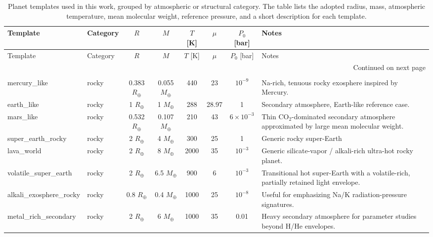 \begin{longtable}{llcccccl}
\caption{Planet templates used in this work, grouped by atmospheric or structural category. The table lists the adopted radius, mass, atmospheric temperature, mean molecular weight, reference pressure, and a short description for each template.} \\
\toprule
Template & Category & $R$ & $M$ & $T$ [K] & $\mu$ & $P_0$ [bar] & Notes \\
\midrule
\endfirsthead

\toprule
Template & Category & $R$ & $M$ & $T$ [K] & $\mu$ & $P_0$ [bar] & Notes \\
\midrule
\endhead

\midrule
\multicolumn{8}{r}{Continued on next page} \\
\midrule
\endfoot

\bottomrule
\endlastfoot

\multicolumn{8}{l}{\textbf{Rocky / terrestrial templates}} \\
\midrule
mercury\_like & rocky & 0.383 $R_\oplus$ & 0.055 $M_\oplus$ & 440 & 23 & $10^{-9}$ & Na-rich, tenuous rocky exosphere inspired by Mercury. \\
earth\_like & rocky & 1 $R_\oplus$ & 1 $M_\oplus$ & 288 & 28.97 & 1 & Secondary atmosphere, Earth-like reference case. \\
mars\_like & rocky & 0.532 $R_\oplus$ & 0.107 $M_\oplus$ & 210 & 43 & $6\times10^{-3}$ & Thin CO$_{2}$-dominated secondary atmosphere approximated by large mean molecular weight. \\
super\_earth\_rocky & rocky & 2 $R_\oplus$ & 4 $M_\oplus$ & 300 & 25 & 1 & Generic rocky super-Earth \\
lava\_world & rocky & 2 $R_\oplus$ & 8 $M_\oplus$ & 2000 & 35 & $10^{-3}$ & Generic silicate-vapor / alkali-rich ultra-hot rocky planet. \\
volatile\_super\_earth & rocky & 2 $R_\oplus$ & 6.5 $M_\oplus$ & 900 & 6 & $10^{-3}$ & Transitional hot super-Earth with a volatile-rich, partially retained light envelope. \\
alkali\_exosphere\_rocky & rocky & 0.8 $R_\oplus$ & 0.4 $M_\oplus$ & 1000 & 25 & $10^{-8}$ & Useful for emphasizing Na/K radiation-pressure signatures. \\
metal\_rich\_secondary & rocky & 2 $R_\oplus$ & 6 $M_\oplus$ & 1000 & 35 & 0.01 & Heavy secondary atmosphere for parameter studies beyond H/He envelopes. \\
\midrule


\end{longtable}
